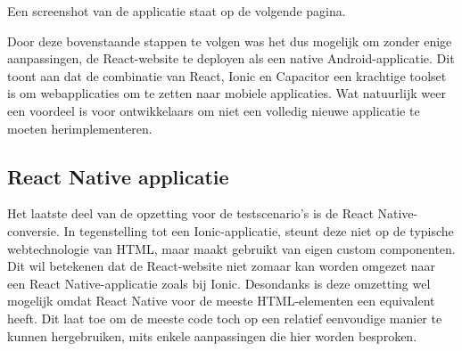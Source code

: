 Een screenshot van de applicatie staat op de volgende pagina.

Door deze bovenstaande stappen te volgen was het dus mogelijk om zonder enige aanpassingen, de React-website te deployen als een native Android-applicatie. Dit toont aan dat de combinatie van React, Ionic en Capacitor een krachtige toolset is om webapplicaties om te zetten naar mobiele applicaties. Wat natuurlijk weer een voordeel is voor ontwikkelaars om niet een volledig nieuwe applicatie te moeten herimplementeren.

\subsection{React Native applicatie}
\label{sec:react-native-applicatie}

Het laatste deel van de opzetting voor de testscenario's is de React Native-conversie. In tegenstelling tot een Ionic-applicatie, steunt deze niet op de typische webtechnologie van HTML, maar maakt gebruikt van eigen custom componenten. Dit wil betekenen dat de React-website niet zomaar kan worden omgezet naar een React Native-applicatie zoals bij Ionic. Desondanks is deze omzetting wel mogelijk omdat React Native voor de meeste HTML-elementen een equivalent heeft. Dit laat toe om de meeste code toch op een relatief eenvoudige manier te kunnen hergebruiken, mits enkele aanpassingen die hier worden besproken.


